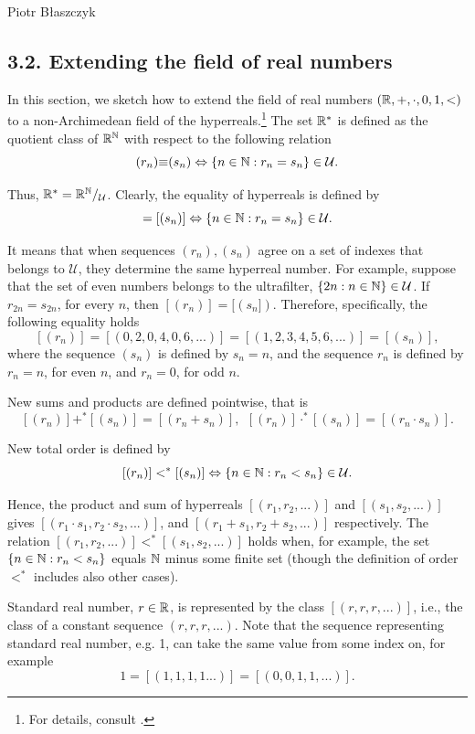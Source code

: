 \begin{artengenv}{Piotr Błaszczyk}
\subsection{3.2. Extending the field of real numbers}

In this section, we sketch  how to extend the field of real numbers
$({\mathbb{R}},+,\cdot,0,1,<)$  to a non-Archimedean field of
the hyperreals.\footnote{For details, consult \parencites{ref_BM}{ref_pb16}.} The set ${\mathbb{R}}^*$  is defined as the quotient class of ${\mathbb{R}}^{{\mathbb{N}}}$ with
 respect to the following relation
\[(r_n)\mathcal \equiv (s_n) \Leftrightarrow \{n\in{\mathbb{N}}: r_n=s_n\}\in \mathcal U.\]

Thus, ${\mathbb{R}}^*={\mathbb{R}}^{{\mathbb{N}}}/_{\mathcal U}$. Clearly, the equality of hyperreals is defined by
\begin{equation}[(r_n)]= [(s_n)] \Leftrightarrow \{n\in\N: r_n=s_n\}\in \mathcal U. \end{equation}

It means that when sequences  $(r_n), (s_n)$ agree on a set of indexes that belongs to $\mathcal U$, 
they determine the same hyperreal number.  For example, suppose that the set of even numbers belongs to the ultrafilter, 
$\{2n: n\in {\mathbb{N}}\}\in\mathcal U$. If $r_{2n}=s_{2n}$, for every $n$, then $[(r_n)]=[(s_n])$. Therefore, specifically, the following equality holds
\[[(r_n)]=[(0,2,0,4,0,6,...)]=[(1,2,3,4,5,6,...)]=[(s_n)],\]
where the sequence $(s_n)$ is defined by $s_n=n$, and the sequence $r_n$ is defined by $r_n=n$, for even $n$, and
$r_n=0$, for odd $n$.


New sums and products are defined pointwise, that is
\[[(r_n)]+^*[(s_n)]=[(r_n+s_n)],\ \    [(r_n)]\cdot^*[(s_n)]=[(r_n\cdot s_n)].\]

New total order is defined by
\[[(r_n)]<^*[(s_n)]\Leftrightarrow \{n\in{\mathbb{N}}: r_n<s_n\}\in\mathcal U.\]

Hence, the product and sum of hyperreals $[(r_1,r_2,...)]$ and $[(s_1,s_2,...)]$ gives
$[(r_1\cdot s_1,r_2\cdot s_2,...)]$, and  $[(r_1+ s_1,r_2+ s_2,...)]$ respectively.
The relation
$[(r_1,r_2,...)]<^*[(s_1,s_2,...)]$ holds when, for example, the set $\{n\in{\mathbb{N}}: r_n<s_n\}$ equals ${\mathbb{N}}$ minus some finite set (though the definition of order $<^*$  includes also  other cases).


Standard real number, $r\in{\mathbb{R}}$, is represented by the class $[(r,r,r,...)]$, i.e., the class of a constant sequence $(r,r,r,...)$. Note that the sequence representing standard real number, e.g. 1, can take the same value from some index on, for example
\[1=[(1,1,1,1...)]=[(0,0,1,1,...)].\]


\end{artengenv}
